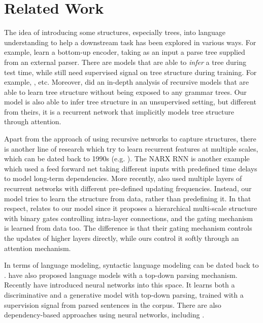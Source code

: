 \documentclass{article} \usepackage{iclr2018_conference,times}
\begin{document}
\section{Related Work}
The idea of introducing some structures, especially trees, into language 
understanding to help a downstream task has been explored in various ways. For example, \cite{socher2013recursive, tai2015improved} learn a bottom-up encoder, taking as an input a parse tree supplied from an external parser. There are models that are able to \emph{infer} a tree during test time, while still need supervised signal on tree structure during training. For example, \citep{socher2010learning, alvarez2016tree, zhou2017generative, zhang2015top}, etc. Moreover, \cite{williams2017learning} did an in-depth analysis of recursive models that are able to learn tree structure without being exposed to any grammar trees. Our model is also able to infer tree structure in an unsupervised setting, but different from theirs, it is a recurrent network that implicitly models tree structure through attention.

Apart from the approach of using recursive networks to capture structures, there is another line of research which try to learn recurrent features at multiple scales, which can be dated back to 1990s (e.g. \cite{ElHihi+Bengio-nips8, Schmidhuber91neuralsequence, lin1998learning}). The NARX RNN \citep{lin1998learning} is another example which used a feed forward net taking different inputs with predefined time delays to model long-term dependencies. More recently, \cite{koutnik2014clockwork} also used multiple layers of recurrent networks with different pre-defined updating frequencies. Instead, our model tries to learn the structure from data, rather than predefining it. In that respect, \cite{chung2016hierarchical} relates to our model since it proposes a hierarchical multi-scale structure with binary gates controlling intra-layer connections, and the gating mechanism is learned from data too. The difference is that their gating mechanism controls the updates of higher layers directly, while ours control it softly through an attention mechanism.



In terms of language modeling, syntactic language modeling can be dated back to \cite{chelba1997structured}. \cite{charniak2001immediate, roark2001probabilistic} have also proposed language models with a top-down parsing mechanism. Recently \cite{dyer2016recurrent, kuncoro2016recurrent} have introduced neural networks into this space. It learns both a discriminative and a generative model with top-down parsing, trained with a supervision signal from parsed sentences in the corpus. There are also dependency-based approaches using neural networks, including \cite{buys2015generative, emami2005neural, titov2010latent}.
\end{document}
